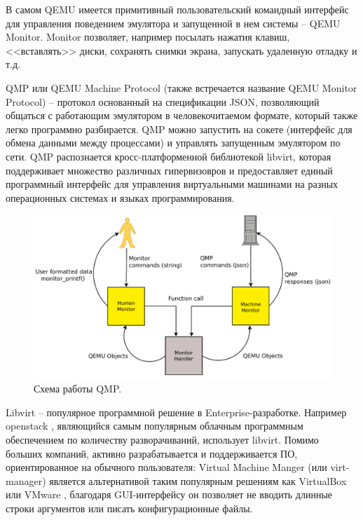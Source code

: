 В самом QEMU имеется примитивный пользовательский командный интерфейс для управления поведением эмулятора
и запущенной в нем системы -- QEMU Monitor. Monitor позволяет, например
посылать нажатия клавиш, <<вставлять>> диски, сохранять снимки экрана, запускать удаленную отладку и т.д.

QMP \cite{qmp} или QEMU Machine Protocol (также встречается название QEMU Monitor Protocol) -- протокол
основанный на спецификации JSON, позволяющий общаться с работающим эмулятором в человекочитаемом
формате, который также легко программно разбирается.
QMP можно запустить на сокете (интерфейс для обмена данными между процессами) и управлять запущенным эмулятором по сети.
QMP распознается кросс-платформенной библиотекой libvirt, которая поддерживает множество
различных гипервизовров и предоставляет единый программный интерфейс для управления виртуальными машинами на
разных операционных системах и языках программирования.

\begin{figure}[!htbp]
    \centering
    \begin{adjustbox}{max totalsize={0.8\textwidth}{\textheight}}
        \includegraphics[]{images/qmp.png}
    \end{adjustbox}
    \caption{Схема работы QMP.}\label{fig:qmp}
\end{figure}

Libvirt -- популярное программной решение в Enterprise-разработке. Например openstack \cite{openstack}, являющийся
самым популярным облачным программным обеспечением по количеству разворачиваний, использует libvirt.
Помимо больших компаний, активно разрабатывается и поддерживается ПО, ориентированное на обычного пользователя:
Virtual Machine Manger (или virt-manager) является альтернативой таким популярным решениям как VirtualBox \cite{virtualbox} или
VMware \cite{vmware}, благодаря GUI-интерфейсу он позволяет не вводить длинные строки аргументов или писать
конфигурационные файлы.

